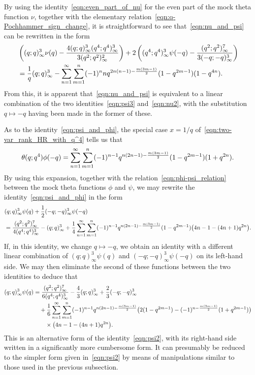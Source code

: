 \documentclass[11pt,reqno]{amsart}
\renewcommand{\=}{\;=\;}
\theoremstyle{myremark}
\begin{document}
By using the identity~\eqref{eqn:even_part_of_nu} for the even part of the mock theta function $\nu$, together with the elementary relation~\eqref{eqn:q-Pochhammer_sign_change}, it is straightforward to see that~\eqref{eqn:nu_and_psi} can be rewritten in the form
\begin{align*}
&\left( (q;q)_\infty^3 \nu(q) - {4 (q;q)_\infty^3 (q^4;q^4)_\infty^3 \over 3(q^2;q^2)_\infty^2} \right) + 2\left( (q^4;q^4)_\infty^3 \psi(-q) - {(q^2;q^2)_\infty^7 \over 3(-q;-q)_\infty^3} \right) \\
&= {1 \over q}(q;q)_\infty^3 - \sum_{n=1}^{\infty} \sum_{m=1}^n (-1)^n n q^{2n(n-1)-{m(3m-1) \over 2}} (1-q^{2m-1})(1 - q^{4n}).
\end{align*}
From this, it is apparent that~\eqref{eqn:nu_and_psi} is equivalent to a linear combination of the two identities~\eqref{eqn:psi3} and~\eqref{eqn:nu2}, with the substitution $q \mapsto -q$ having been made in the former of these.

As to the identity~\eqref{eqn:psi_and_phi}, the special case $x=1/q$ of~\eqref{eqn:two-var_rank_HR_with_q^4} tells us that
\[ \theta(q;q^4) \phi(-q) = \sum_{n=1}^\infty \sum_{m=1}^n (-1)^{n-1} q^{n(2n-1)-{m(3m-1) \over 2}} (1-q^{2m-1})(1+q^{2n}). \]
By using this expansion, together with the relation~\eqref{eqn:phi-psi_relation} between the mock theta functions $\phi$ and $\psi$, we may rewrite the identity~\eqref{eqn:psi_and_phi} in the form
\begin{align*}
&(q;q)_\infty^3 \psi(q) + {1 \over 2} (-q;-q)_\infty^3 \psi(-q) \\
&= {(q^2;q^2)_\infty^7 \over 4(q^4;q^4)_\infty^3} - (q;q)_\infty^3 + {1 \over 4} \sum_{n=1}^\infty \sum_{m=1}^n (-1)^{n-1}q^{n(2n-1) - {m(3m-1) \over 2}} (1-q^{2m-1})\big(4n-1-(4n+1)q^{2n}\big).
\end{align*}
If, in this identity, we change $q \mapsto -q$, we obtain an identity with a different linear combination of $(q;q)_\infty^3 \psi(q)$ and $(-q;-q)_\infty^3 \psi(-q)$ on its left-hand side. We may then eliminate the second of these functions between the two identities to deduce that
\begin{align*}
(q;q)_\infty^3 \psi(q) &= {(q^2;q^2)_\infty^7 \over 6(q^4;q^4)_\infty^3} - {4 \over 3}(q;q)_\infty^3 + {2 \over 3}(-q;-q)_\infty^3 \\
&\quad + {1 \over 6} \sum_{n=1}^\infty \sum_{m=1}^n (-1)^{n-1}q^{n(2n-1) - {m(3m-1) \over 2}} \big(2(1-q^{2m-1}) - (-1)^{n-{m(3m-1) \over 2}}(1+q^{2m-1}) \big) \\
&\qquad \times \big(4n-1-(4n+1)q^{2n}\big).
\end{align*}
This is an alternative form of the identity~\eqref{eqn:psi2}, with its right-hand side written in a significantly more cumbersome form. It can presumably be reduced to the simpler form given in~\eqref{eqn:psi2} by means of manipulations similar to those used in the previous subsection.
\end{document}
